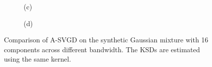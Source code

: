 \begin{figure}[t!]
\hfill
\centering
\begin{subfigure}[b]{0.48\textwidth}
    \caption{(c)\label{fig:bw10}}
\end{subfigure}
\hfill
\centering
\begin{subfigure}[b]{0.48\textwidth}
    \caption{(d)\label{fig:bwmed}}
\end{subfigure}

\caption{Comparison of A-SVGD on the synthetic Gaussian mixture with 16 components across different bandwidth. The KSDs are estimated using the same kernel.}
\label{fig:BW}
\end{figure}








